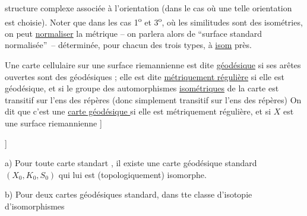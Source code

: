 structure complexe associée à l'orientation (dans le cas où une telle orientation est choisie). Noter que dans les cas 1\textsuperscript{o} et 3\textsuperscript{o}, où les similitudes sont des isométries, on peut \uline{normaliser} la métrique -- on parlera alors de \textquotedblleft surface standard normalisée\textquotedblright\ -- déterminée, pour chacun des  trois types, à \uline{isom} près.

Une carte cellulaire sur une surface riemannienne  est dite \uline{géodésique} si  ses arêtes ouvertes sont des  géodésiques ; elle est dite \uline{métriquement régulière} si elle est géodésique, et si le groupe des automorphismes \uline{isométriques} de la carte est transitif sur l'ens des répères (donc simplement transitif sur l'ens des répères) On dit que c'est une \uline{carte géodésique } si elle est métriquement régulière,  et si  $X$  est une surface riemannienne    ]

   ]

a) Pour toute carte standart , il existe  une carte géodésique standard $(X_0,K_0,S_0)$ qui lui est (topologiquement) isomorphe.

 b) Pour deux cartes géodésiques standard, dans tte classe d'isotopie d'isomorphismes

